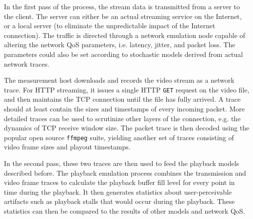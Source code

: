 In the first pass of the process, the stream data is transmitted from a server to the client. The server can either be an actual streaming service on the Internet, or a local server (to eliminate the unpredictable impact of the Internet connection). The traffic is directed through a network emulation node capable of altering the network QoS parameters, i.e. latency, jitter, and packet loss. The parameters could also be set according to stochastic models derived from actual network traces. 

The measurement host downloads and records the video stream as a network trace. For HTTP streaming, it issues a single HTTP \texttt{GET} request on the video file, and then maintains the TCP connection until the file has fully arrived. A trace should at least contain the sizes and timestamps of every incoming packet. More detailed traces can be used to scrutinize other layers of the connection, e.g. the dynamics of TCP receive window size. The packet trace is then decoded using the popular open source \texttt{ffmpeg} suite, yielding another set of traces consisting of video frame sizes and playout timestamps.

In the second pass, these two traces are then used to feed the playback models described before. The playback emulation process combines the transmission and video frame traces to calculate the playback buffer fill level for every point in time during the playback. It then generates statistics about user-perceivable artifacts such as playback stalls that would occur during the playback. These statistics can then be compared to the results of other models and network QoS.




